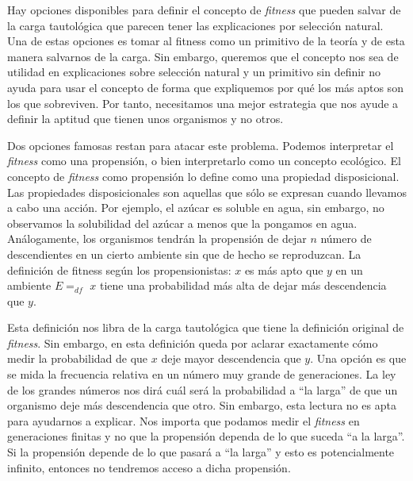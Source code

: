 Hay opciones disponibles para definir el concepto de \emph{fitness} que pueden salvar de la carga tautológica que parecen tener
las explicaciones por selección natural. 
Una de estas opciones es tomar al fitness como un primitivo de la teoría y de esta manera salvarnos de la carga. Sin embargo,
queremos que el concepto nos sea de utilidad en explicaciones sobre selección natural y un primitivo sin definir no ayuda para
usar el concepto de forma que expliquemos por qué los más aptos son los que sobreviven.
Por tanto, necesitamos una mejor estrategia que nos ayude a definir la aptitud que tienen unos organismos y no otros.

Dos opciones famosas restan para atacar este problema. Podemos interpretar el \emph{fitness} como una propensión, o bien
interpretarlo como un concepto ecológico. El concepto de \emph{fitness} como propensión lo define como una propiedad
disposicional. Las propiedades disposicionales son aquellas que sólo se expresan cuando llevamos a cabo una acción. Por ejemplo,
el azúcar es soluble en agua, sin embargo, no observamos la solubilidad del azúcar a menos que la pongamos en agua. Análogamente,
los organismos tendrán la propensión de dejar $n$ número de descendientes en un cierto ambiente sin que de hecho se reproduzcan. La definición de fitness según los propensionistas: $x$ es más apto que $y$ en un ambiente $E =_{df}$ $x$ tiene una probabilidad más alta de dejar más descendencia que $y$.

Esta definición nos libra de la carga tautológica que tiene la definición original de \emph{fitness}. Sin embargo, en esta definición queda por aclarar exactamente cómo medir la probabilidad de que $x$ deje mayor descendencia que $y$. Una opción es que se mida la frecuencia relativa en un número muy grande de generaciones. La ley de los grandes números nos dirá cuál será la probabilidad a ``la larga'' de que un organismo deje más descendencia que otro. Sin embargo, esta lectura no es apta para ayudarnos a explicar. Nos importa que podamos medir el \emph{fitness} en generaciones finitas y no que la propensión dependa de lo que suceda ``a la larga''. Si la propensión depende de lo que pasará a ``la larga'' y esto es potencialmente infinito, entonces no tendremos acceso a dicha propensión.

